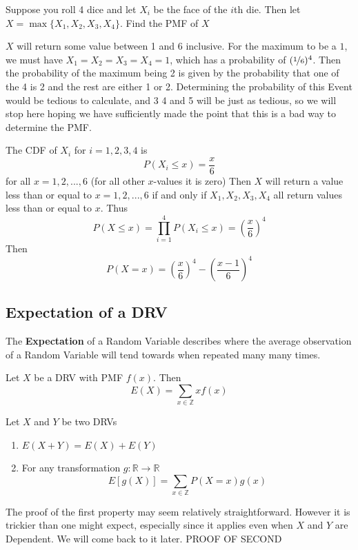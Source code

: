 \documentclass{report}
\begin{document}
\begin{example}
    Suppose you roll 4 dice and let $X_i$ be the face of the $i$th die. Then let $X=\max\{X_1, X_2, X_3, X_4\}$. Find the PMF of $X$

    $X$ will return some value between 1 and 6 inclusive. For the maximum to be a $1$, we must have $X_1=X_2=X_3=X_4=1$, which has a probability of $(\nicefrac 1 6)^4$. Then the probability of the maximum being 2 is given by the probability that one of the 4 is 2 and the rest are either 1 or 2. Determining the probability of this Event would be tedious to calculate, and 3 4 and 5 will be just as tedious, so we will stop here hoping we have sufficiently made the point that this is a bad way to determine the PMF.
    
    The CDF of $X_i$ for $i=1,2,3,4$ is
    \[
        P(X_i\le x)=\frac x 6
    \]
    for all $x=1,2,...,6$ (for all other $x$-values it is zero) Then $X$ will return a value less than or equal to $x=1,2,...,6$ if and only if $X_1, X_2,X_3,X_4$ all return values less than or equal to $x$. Thus
    \[
        P(X\le x)=\prod_{i=1}^4 P(X_i\le x)=\left(\frac x 6\right)^4
    \]
    Then
    \[
        P(X=x)= \left(\frac x 6\right)^4-\left(\frac {x-1} 6\right)^4
    \]
\end{example}

\subsection{Expectation of a DRV}
\newcommand{\E}{\textup{E}}
The \textbf{Expectation} of a Random Variable describes where the average observation of a Random Variable will tend towards when repeated many many times.
\begin{definition}
Let $X$ be a DRV with PMF $f(x)$. Then
    \[
        E(X)=\sum_{x\in\mathbb Z} x f(x)
    \]
    
\end{definition}
\begin{theorem}
    Let $X$ and $Y$ be two DRVs
    \begin{enumerate}
        \item $E(X+Y)=E(X)+E(Y)$
        \item For any transformation $g:\mathbb R\to\mathbb R$
        \[
            E\left[g(X)\right] = \sum_{x\in \mathbb Z} P(X=x) g(x)
        \]
    \end{enumerate}
    The proof of the first property may seem relatively straightforward. However it is trickier than one might expect, especially since it applies even when $X$ and $Y$ are Dependent. We will come back to it later.
    \todo PROOF OF SECOND
\end{theorem}
\end{document}
